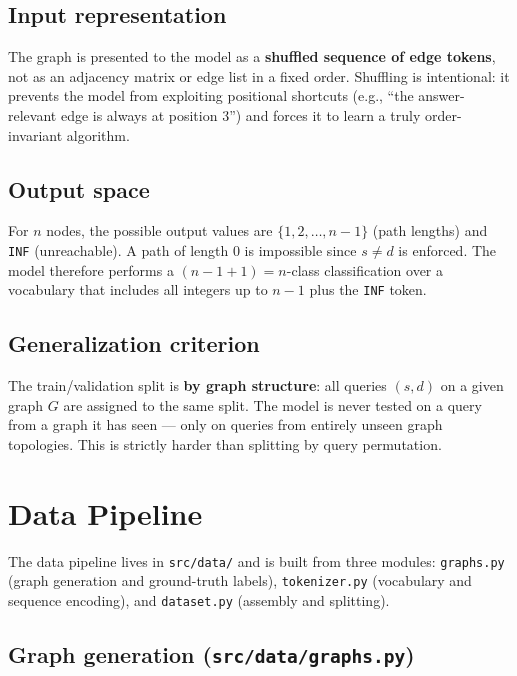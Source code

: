 \documentclass[11pt, a4paper]{article}
\begin{document}
\subsection{Input representation}

The graph is presented to the model as a \textbf{shuffled sequence of edge
tokens}, not as an adjacency matrix or edge list in a fixed order. Shuffling
is intentional: it prevents the model from exploiting positional shortcuts
(e.g., ``the answer-relevant edge is always at position 3'') and forces it
to learn a truly order-invariant algorithm.

\subsection{Output space}

For $n$ nodes, the possible output values are $\{1, 2, \ldots, n-1\}$ (path
lengths) and \texttt{INF} (unreachable). A path of length 0 is impossible
since $s \neq d$ is enforced. The model therefore performs a
$(n-1+1) = n$-class classification over a vocabulary that includes all
integers up to $n-1$ plus the \texttt{INF} token.

\subsection{Generalization criterion}

The train/validation split is \textbf{by graph structure}: all queries
$(s, d)$ on a given graph $G$ are assigned to the same split. The model is
never tested on a query from a graph it has seen --- only on queries from
entirely unseen graph topologies. This is strictly harder than splitting by
query permutation.

\section{Data Pipeline}

The data pipeline lives in \texttt{src/data/} and is built from three modules:
\texttt{graphs.py} (graph generation and ground-truth labels),
\texttt{tokenizer.py} (vocabulary and sequence encoding), and
\texttt{dataset.py} (assembly and splitting).

\subsection{Graph generation (\texttt{src/data/graphs.py})}
\end{document}
